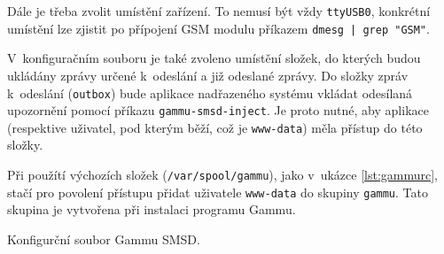 Dále je třeba zvolit umístění zařízení. To nemusí být vždy \texttt{ttyUSB0}, konkrétní umístění lze zjistit po přípojení GSM modulu příkazem \texttt{dmesg | grep "GSM"}.

V~konfiguračním souboru je také zvoleno umístění složek, do kterých budou ukládány zprávy určené k~odeslání a již odeslané zprávy. Do složky zpráv k~odeslání (\texttt{outbox}) bude aplikace nadřazeného systému vkládat odesílaná upozornění pomocí příkazu \texttt{gammu-smsd-inject}. Je proto nutné, aby aplikace (respektive uživatel, pod kterým běží, což je \texttt{www-data}) měla přístup do této složky.

Při použítí výchozích složek (\texttt{/var/spool/gammu}), jako v~ukázce \ref{lst:gammurc}, stačí pro povolení přístupu přidat uživatele \texttt{www-data} do skupiny \texttt{gammu}. Tato skupina je vytvořena při instalaci programu Gammu.

\begin{listing}[htbp]
\caption{\label{lst:gammurc} Konfigurční soubor Gammu SMSD.}
\inputminted[bgcolor=codebg]{ini}{source-samples/gammurc}
\end{listing}
